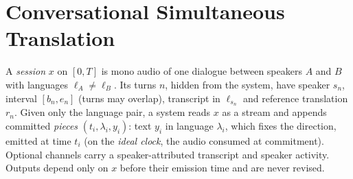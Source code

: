 \section{Conversational Simultaneous Translation}
\label{sec:task}

\begin{definition}[\task]
\label{def:cst}
A \emph{session} $x$ on $[0,T]$ is mono audio of one dialogue between speakers $A$ and $B$ with languages $\ell_A\neq\ell_B$. Its turns $n$, hidden from the system, have speaker $s_n$, interval $[b_n,e_n]$ (turns may overlap), transcript in $\ell_{s_n}$ and reference translation $r_n$. Given only the language pair, a system reads $x$ as a stream and appends committed \emph{pieces} $(t_i,\lambda_i,y_i)$: text $y_i$ in language $\lambda_i$, which fixes the direction, emitted at time $t_i$ (on the \emph{ideal clock}, the audio consumed at commitment). Optional channels carry a speaker-attributed transcript and speaker activity. Outputs depend only on $x$ before their emission time and are never revised.
\end{definition}

